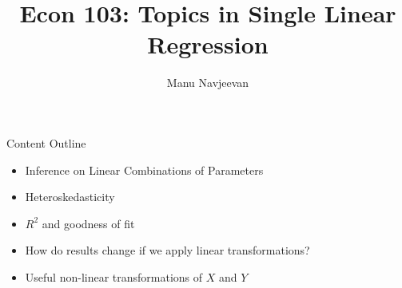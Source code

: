 \documentclass[notheorems, 9pt]{beamer}
\title{Econ 103: Topics in Single Linear Regression}
\author{Manu Navjeevan}
\institute{UCLA}
\begin{document}
\frame{\titlepage}


\begin{frame}{Content Outline} 
	\label{frame:content-outline}
	\begin{itemize}
		\item Inference on Linear Combinations of Parameters
		\item Heteroskedasticity
	\end{itemize}
	\begin{itemize}
		\item \(R^2\) and goodness of fit
	\end{itemize}
	\begin{itemize}
		\item How do results change if we apply linear transformations?
		\item Useful non-linear transformations of \(X\) and \(Y\)
	\end{itemize}
\end{frame}
\end{document}
